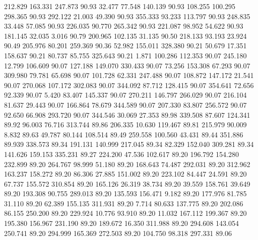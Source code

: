  212.829  163.331  247.873        90.93
  32.477   77.548  140.139        90.93
 108.255  100.295  298.365        90.93
 292.122   21.003   49.390        90.93
 355.333   93.233  113.797        90.93
 248.835   33.448   57.085        90.93
 226.035   90.770  265.342        90.93
 221.087   98.952   54.622        90.93
 181.145   32.035    3.016        90.79
 200.965  102.135   31.135        90.50
 218.133   93.193   23.924        90.49
 205.976   80.201  259.369        90.36
  52.982  155.011  328.380        90.21
  50.679   17.351  158.637        90.21
  80.737   85.755  325.643        90.21
   1.871  100.286  112.353        90.07
 245.180   12.799  106.609        90.07
 127.188  149.070  330.433        90.07
  73.256  153.308   67.293        90.07
 309.980   79.781   65.698        90.07
 101.728   62.331  247.488        90.07
 108.872  147.172   21.541        90.07
 270.068  107.172  302.083        90.07
 344.092   87.712  128.415        90.07
 354.641   72.656   92.339        90.07
   5.420   83.407  145.337        90.07
 270.211  146.797  266.029        90.07
 216.104   81.637   29.443        90.07
 166.864   78.679  344.589        90.07
 207.330   83.807  256.572        90.07
  92.650   66.908  293.720        90.07
 344.546   30.069   27.353        89.98
 339.508   87.607  124.341        89.92
  96.003   76.716  313.744        89.86
 206.335   10.630  119.467        89.81
 215.979   90.009    8.832        89.63
  49.787   80.144  108.514        89.49
 259.558  100.560   43.431        89.44
 351.886   89.939  338.573        89.34
 191.131  140.999  217.045        89.34
  82.329  152.040  309.281        89.34
 141.626  159.153  335.231        89.27
 224.200   47.536  102.617        89.20
 196.792  154.280  232.899        89.20
 264.767   98.999   51.180        89.20
 168.643   74.487  292.031        89.20
 312.962  163.237  158.272        89.20
  86.306   27.885  151.002        89.20
 223.102   84.447   24.591        89.20
  67.737  155.572  310.854        89.20
 165.126   26.319   38.734        89.20
  39.559  158.761   39.649        89.20
 193.308   90.755  289.013        89.20
 135.593  156.471    9.182        89.20
 177.976   81.785   31.110        89.20
  62.389  155.135  311.931        89.20
   7.714   80.633  137.775        89.20
 202.086   86.155  250.200        89.20
 229.924   10.776   93.910        89.20
  11.032  167.112  199.367        89.20
 195.380  156.967  231.190        89.20
 189.672   16.350  311.988        89.20
 294.608  143.054  250.741        89.20
 294.999  165.369  272.503        89.20
 104.750   98.318  297.331        89.06
